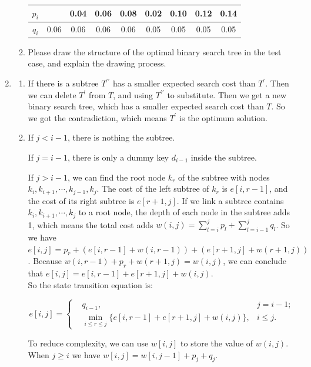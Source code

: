 \documentclass[12pt,a4paper]{article}
\makeatletter
\newtheorem*{solution}{Solution}
\theoremstyle{definition}
\renewenvironment{solution}[1][Solution] {\par\pushQED{\qed}\normalfont\topsep6\p@\@plus6\p@\relax\trivlist\item[\hskip\labelsep\bfseries#1\@addpunct{.}]\ignorespaces}{\popQED\endtrivlist\@endpefalse} \makeatother
\makeatother
\begin{document}
\begin{enumerate}
\begin{enumerate}
\begin{table}[H]
\begin{tabular}{|c|cccccccc|}
					\hline
					$ p_{i} $&&0.04&0.06&0.08&0.02&0.10&0.12&0.14\\
					\hline
					$ q_{i} $&0.06&0.06&0.06&0.06&0.05&0.05&0.05&0.05\\
					\hline
				\end{tabular}
			\end{table}
			\item Please draw the structure of the optimal binary search tree in the test case, and explain the drawing process.   
		\end{enumerate}
		    \begin{solution}
		        \begin{enumerate}
		        \item If there is a subtree $T^{\prime \prime}$ has a smaller expected search cost than $T^{\prime}$. Then we can delete $T^{\prime}$ from $T$, and using $T^{\prime \prime}$ to substitute. Then we get a new binary search tree, which has a smaller expected search cost than $T$. So we got the contradiction, which means $T^{\prime}$ is the optimum solution.
		        \item If $j < i-1$, there is nothing the subtree. 
		        
		        If $j = i-1$, there is only a dummy key $d_{i-1}$ inside the subtree.  
		        
		        If $j > i-1$, we can find the root node $k_r$ of the subtree with nodes $k_i, k_{i+1}, \cdots, k_{j-1}, k_{j}$. The cost of the left subtree of $k_r$ is $e[i,r-1]$, and the cost of its right subtree is $e[r+1,j]$. If we link a subtree contains $k_i, k_{i+1}, \cdots, k_{j}$ to a root node, the depth of each node in the subtree adds 1, which means the total cost adds $w(i,j)=\sum_{l=i}^{j} p_{l}+\sum_{l=i-1}^{j} q_{l} $. So we have $e[i,j] = p_r + (e[i,r-1]+w(i,r-1)) + (e[r+1,j]+w(r+1,j))$. Because $w(i,r-1) + p_r +w(r+1,j) = w(i,j)$, we can conclude that $e[i,j] = e[i,r-1] + e[r+1,j] + w(i,j)$.\\
		        
		        So the state transition equation is:
		        
		        $$ e[i,j]=\left\{
				\begin{aligned}
					&q_{i-1}, & j = i-1; \\
					&\min_{i\leqslant r \leqslant j} \{e[i,r-1] + e[r+1,j] + w(i,j)\}, &i \leqslant j.
				\end{aligned}
				\right.
				$$
				
				To reduce complexity, we can use $w[i,j]$ to store the value of $w(i,j)$. When $j \geqslant i$ we have $w[i,j] = w[i,j-1] + p_j + q_j$.
				

\end{enumerate}
\end{solution}
\end{enumerate}
\end{document}
